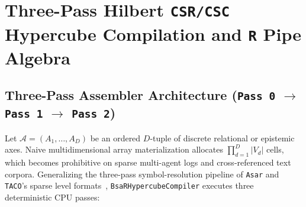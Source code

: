 \documentclass[11pt]{article}
\theoremstyle{plain}
\theoremstyle{definition}
\begin{document}
\section{Three-Pass Hilbert \texttt{CSR/CSC} Hypercube Compilation and \texttt{R} Pipe Algebra}\label{sec:hypercube}

\subsection{Three-Pass Assembler Architecture (\texttt{Pass 0} $\to$ \texttt{Pass 1} $\to$ \texttt{Pass 2})}

Let $\mathcal{A} = (A_1, \dots, A_D)$ be an ordered $D$-tuple of discrete relational or epistemic axes. Naive multidimensional array materialization allocates $\prod_{d=1}^D |V_d|$ cells, which becomes prohibitive on sparse multi-agent logs and cross-referenced text corpora. Generalizing the three-pass symbol-resolution pipeline of \texttt{Asar} and \texttt{TACO}'s sparse level formats~\cite{kjolstad2017taco}, \texttt{BsaRHypercubeCompiler} executes three deterministic CPU passes:
\end{document}
